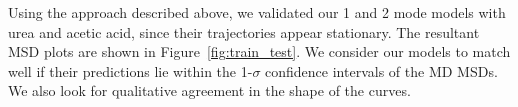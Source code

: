 \documentclass{article}
\begin{document}

  Using the approach described above, we validated our 1 and 2 mode models with
  urea and acetic acid, since their trajectories appear stationary. The 
  resultant MSD plots are shown in Figure~\ref{fig:train_test}. We consider 
  our models to match well if their predictions lie within the 1-$\sigma$
  confidence intervals of the MD MSDs. We also look for qualitative agreement
  in the shape of the curves.
  
\end{document}
